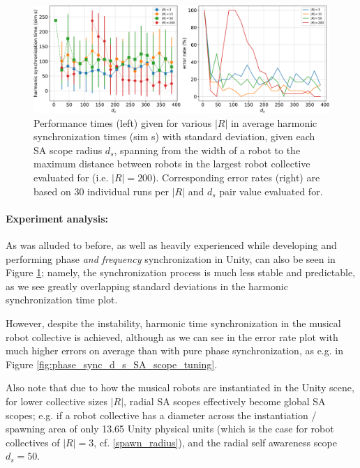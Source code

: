 				\begin{figure}[ht!]
					\centering
					\includegraphics[width=\linewidth]{Assets/DocSegments/Chapters/ExperimentsAndResults/Figures/PerfScores/phase_and_freq_sync_d_s_SA_scope_tuning_experiment_performance.pdf}
					\caption[Experiment results for $\phi$ \& $\omega$ synchronization $d_s$ SA scope tuning experiment.]{Performance times (left) given for various $|R|$ in average harmonic synchronization times (sim s) with standard deviation, given each SA scope radius $d_s$, spanning from the width of a robot to the maximum distance between robots in the largest robot collective evaluated for (i.e. $|R|=200$). Corresponding error rates (right) are based on 30 individual runs per $|R|$ and $d_s$ pair value evaluated for.}
					\label{fig:phase_and_freq_sync_d_s_SA_scope_tuning}
				\end{figure}
				
				\paragraph{Experiment analysis:\nl}
				
				As was alluded to before, as well as heavily experienced while developing and performing phase \textit{and frequency} synchronization in Unity, can also be seen in Figure \ref{fig:phase_and_freq_sync_d_s_SA_scope_tuning}; namely, the synchronization process is much less stable and predictable, as we see greatly overlapping standard deviations in the harmonic synchronization time plot.
				
				However, despite the instability, harmonic time synchronization in the musical robot collective is achieved, although as we can see in the error rate plot with much higher errors on average than with pure phase synchronization, as e.g. in Figure \ref{fig:phase_sync_d_s_SA_scope_tuning}.
				
				Also note that due to how the musical robots are instantiated in the Unity scene, for lower collective sizes $|R|$, radial SA scopes effectively become global SA scopes; e.g. if a robot collective has a diameter across the instantiation / spawning area of only 13.65 Unity physical units (which is the case for robot collectives of $|R|=3$, cf. \eqref{spawn_radius}), and the radial self awareness scope $d_s=50$.
	
